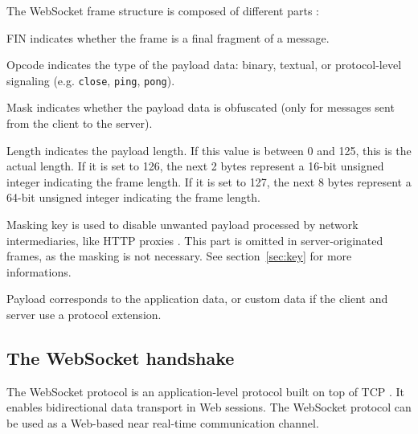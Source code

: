 \documentclass[journal,compsoc]{IEEEtran}
\newcommand{\ttt}[1]{\texttt{#1}}
\newcommand{\ws}{WebSocket}
\begin{document}
The \ws{} frame structure is composed of different parts \cite{HighPerfBrowserNetworking:websocket} \cite{performanceEvaluationOfWebsocketProtocol} :
\begin{LaTeXdescription}    %
    \item[FIN] indicates whether the frame is a final fragment of a message.
    \item[Opcode] indicates the type of the payload data: binary, textual, or protocol-level signaling (e.g. \ttt{close}, \ttt{ping}, \ttt{pong}).
    \item[Mask] indicates whether the payload data is obfuscated (only for messages sent from the client to the server).
    \item[Length] indicates the payload length. If this value is between 0 and 125, this is the actual length.
                    If it is set to 126, the next 2 bytes represent a 16-bit unsigned integer indicating the frame length.
                    If it is set to 127, the next 8 bytes represent a 64-bit unsigned integer indicating the frame length.
    \item[Masking key] is used to disable unwanted payload processed by network intermediaries, like HTTP proxies \cite{performanceEvaluationOfWebsocketProtocol}.
                    This part is omitted in server-originated frames, as the masking is not necessary. See section~\ref{sec:key} for more informations.
    \item[Payload] corresponds to the application data, or custom data if the client and server use a protocol extension.
\end{LaTeXdescription}




\subsection{The \ws{} handshake}
\label{handshake}
The \ws{} protocol is an application-level protocol built on top of TCP \cite{rfc6455}.
It enables bidirectional data transport in Web sessions.
The \ws{} protocol can be used as a Web-based near real-time communication channel.
\end{document}
